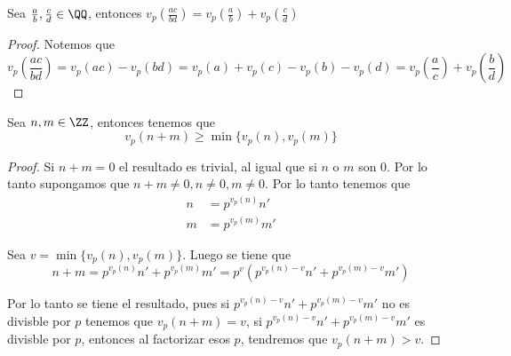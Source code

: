 \documentclass[a4paper,oneside,10.5pt]{USMArt}
\begin{document}
\begin{prop}
  Sea $\frac{a}{b}, \frac{c}{d} \in \QQ$, entonces $v_{p}(\frac{ac}{bd}) = v_{p}(\frac{a}{b}) + v_{p}(\frac{c}{d})$
\end{prop}
\begin{proof}
  Notemos que
  \begin{equation*}
    v_{p}(\frac{ac}{bd}) = v_{p}(ac) - v_{p}(bd) = v_{p}(a) + v_{p}(c) - v_{p}(b) - v_{p}(d) = v_{p}(\frac{a}{c}) + v_{p}(\frac{b}{d})
  \end{equation*}
\end{proof}

\begin{prop}
  Sea $n, m \in \ZZ$, entonces tenemos que
  \begin{equation*}
    v_{p}(n + m) \geq \min \{v_{p}(n), v_{p}(m)\}
  \end{equation*}
\end{prop}

\begin{proof}
  Si $n + m = 0$ el resultado es trivial, al igual que si $n$ o $m$ son $0$. Por lo tanto supongamos que
  $n + m \neq 0, n \neq 0, m \neq 0$. Por lo tanto tenemos que
  \begin{align*}
    n &= p^{v_{p}(n)}n'\\
    m &= p^{v_{p}(m)}m'
  \end{align*}

  Sea $v = \min \{v_{p}(n), v_{p}(m)\}$. Luego se tiene que
  \begin{equation*}
    n + m = p^{v_{p}(n)}n' + p^{v_{p}(m)}m' = p^{v}(p^{v_{p}(n) - v}n' + p^{v_{p}(m) - v}m')
  \end{equation*}

  Por lo tanto se tiene el resultado, pues si $p^{v_{p}(n) - v}n' + p^{v_{p}(m) - v}m'$ no es divisble por $p$ tenemos
  que $v_{p}(n + m) = v$, si $p^{v_{p}(n) - v}n' + p^{v_{p}(m) - v}m'$ es divisble por $p$, entonces al factorizar esos
  $p$, tendremos que $v_{p}(n + m) > v$.
\end{proof}
\end{document}
